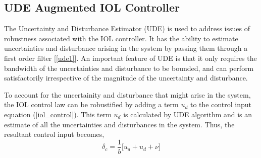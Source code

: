 \documentclass[conference]{IEEEtran}
\begin{document}
	\subsection{UDE Augmented IOL Controller}
		The Uncertainty and Disturbance Estimator (UDE) is used to address issues of robustness associated with the IOL controller. It has the ability to estimate uncertainties and disturbance arising in the system by passing them through a first order filter [\ref{ude1}]. An important feature of UDE is that it only requires the bandwidth of the uncertainties and disturbance to be bounded, and can perform satisfactorily irrespective of the magnitude of the uncertainty and disturbance.
	
		To account for the uncertainity and disturbance that might arise in the system, the IOL control law can be robustified by adding a term $u_d$ to the control input equation (\ref{iol_control}). This term $u_d$ is calculated by UDE algorithm and is an estimate of all the uncertainties and disturbances in the system. Thus, the resultant control input becomes, 
		\begin{equation}
		\label{ude_control_law}
			\delta_c = \frac{1}{b}\Big[u_a+u_d+\nu\Big] 
		\end{equation}
		
\end{document}
